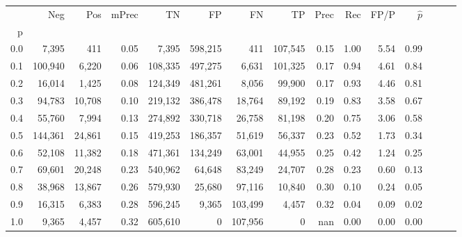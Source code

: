 \begin{tabular}{rrrrrrrrrrrrrrr}
\toprule
{} &      Neg &     Pos & mPrec &       TN &       FP &       FN &       TP &  Prec &   Rec &  FP/P & $\hat{p}$ \\
p   &          &         &       &          &          &          &          &       &       &       &           \\
\midrule
0.0 &    7,395 &     411 &  0.05 &    7,395 &  598,215 &      411 &  107,545 &  0.15 &  1.00 &  5.54 &      0.99 \\
0.1 &  100,940 &   6,220 &  0.06 &  108,335 &  497,275 &    6,631 &  101,325 &  0.17 &  0.94 &  4.61 &      0.84 \\
0.2 &   16,014 &   1,425 &  0.08 &  124,349 &  481,261 &    8,056 &   99,900 &  0.17 &  0.93 &  4.46 &      0.81 \\
0.3 &   94,783 &  10,708 &  0.10 &  219,132 &  386,478 &   18,764 &   89,192 &  0.19 &  0.83 &  3.58 &      0.67 \\
0.4 &   55,760 &   7,994 &  0.13 &  274,892 &  330,718 &   26,758 &   81,198 &  0.20 &  0.75 &  3.06 &      0.58 \\
0.5 &  144,361 &  24,861 &  0.15 &  419,253 &  186,357 &   51,619 &   56,337 &  0.23 &  0.52 &  1.73 &      0.34 \\
0.6 &   52,108 &  11,382 &  0.18 &  471,361 &  134,249 &   63,001 &   44,955 &  0.25 &  0.42 &  1.24 &      0.25 \\
0.7 &   69,601 &  20,248 &  0.23 &  540,962 &   64,648 &   83,249 &   24,707 &  0.28 &  0.23 &  0.60 &      0.13 \\
0.8 &   38,968 &  13,867 &  0.26 &  579,930 &   25,680 &   97,116 &   10,840 &  0.30 &  0.10 &  0.24 &      0.05 \\
0.9 &   16,315 &   6,383 &  0.28 &  596,245 &    9,365 &  103,499 &    4,457 &  0.32 &  0.04 &  0.09 &      0.02 \\
1.0 &    9,365 &   4,457 &  0.32 &  605,610 &        0 &  107,956 &        0 &   nan &  0.00 &  0.00 &      0.00 \\
\bottomrule
\end{tabular}
